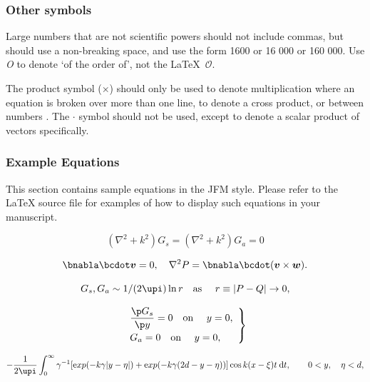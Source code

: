 \documentclass[lineno]{jfm}
\begin{document}
\subsubsection{Other symbols}  Large numbers  that are not scientific powers should not include commas, but should use a non-breaking space, and use the form 1600 or 16 000 or 160 000.
Use \textit{O} to denote `of the order of', not the \LaTeX\ $\mathcal{O}$.

The product symbol ($\times$) should only be used to denote multiplication where an equation is broken over more than one line, to denote a cross product, or between numbers . The $\boldsymbol {\cdot}$ symbol should not be used, except to denote a scalar product of vectors specifically.

\subsubsection{Example Equations}
 This section contains sample equations in the JFM style. Please refer to the {\LaTeX} source file for examples of how to display such equations in your manuscript.

\begin{equation}
  (\nabla^2+k^2)G_s=(\nabla^2+k^2)G_a=0
  \label{Helm}
\end{equation}

\begin{equation}
  \bnabla\bcdot\boldsymbol{v} = 0,\quad \nabla^{2}P=
    \bnabla\bcdot(\boldsymbol{v}\times \boldsymbol{w}).
\end{equation}

\begin{equation}
  G_s,G_a\sim 1 / (2\upi)\ln r
  \quad \mbox{as\ }\quad r\equiv|P-Q|\rightarrow 0,
  \label{singular}
\end{equation}

\begin{equation}
\left. \begin{array}{ll}
\displaystyle\frac{\p G_s}{\p y}=0
  \quad \mbox{on\ }\quad y=0,\\[8pt]
\displaystyle  G_a=0
  \quad \mbox{on\ }\quad y=0,
 \end{array}\right\}
  \label{symbc}
\end{equation}


\begin{equation}
  -\frac{1}{2\upi} \int_0^{\infty} \gamma^{-1}[\mathrm exp(-k\gamma|y-\eta|)
   + \mathrm exp(-k\gamma(2d-y-\eta))] \cos k(x-\xi)t\:\mathrm{d} t,
   \qquad 0<y,\quad \eta<d,
\end{equation}
\end{document}

